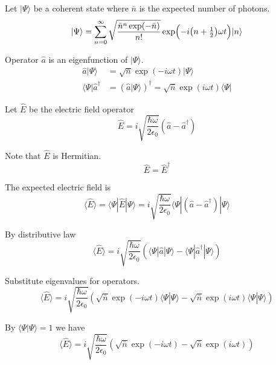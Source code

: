 \documentclass[12pt]{article}
\begin{document}
Let $|\Psi\rangle$ be a coherent state where $\bar n$ is the expected number of photons.
\begin{equation*}
|\Psi\rangle=\sum_{n=0}^\infty
\sqrt{\frac{\bar n^n\exp(-\bar n)}{n!}}
\exp\Bigl(-i\bigl(n+\tfrac{1}{2}\bigr)\omega t\Bigr)
|n\rangle
\end{equation*}

Operator $\hat a$ is an eigenfunction of $|\Psi\rangle$.
\begin{align*}
\hat a|\Psi\rangle&=\sqrt{\bar n}\exp(-i\omega t)|\Psi\rangle
\\
\langle\Psi|\hat a^\dag&=\left(\hat a|\Psi\rangle\right)^\dag=\sqrt{\bar n}\exp(i\omega t)\langle\Psi|
\end{align*}

Let $\hat E$ be the electric field operator
\begin{equation*}
\hat E=i\sqrt{\frac{\hbar\omega}{2\epsilon_0}}
(\hat a-\hat a^\dag)
\end{equation*}

Note that $\hat E$ is Hermitian.
\begin{equation*}
\hat E=\hat E^\dag
\end{equation*}

The expected electric field is
\begin{equation*}
\langle\hat E\rangle
=\langle\Psi|\hat E|\Psi\rangle
=i\sqrt{\frac{\hbar\omega}{2\epsilon_0}}
\langle\Psi|(\hat a-\hat a^\dag)|\Psi\rangle
\end{equation*}

By distributive law
\begin{equation*}
\langle\hat E\rangle
=i\sqrt{\frac{\hbar\omega}{2\epsilon_0}}
\left(\langle\Psi|\hat a|\Psi\rangle-\langle\Psi|\hat a^\dag|\Psi\rangle\right)
\end{equation*}

Substitute eigenvalues for operators.
\begin{equation*}
\langle\hat E\rangle
=i\sqrt{\frac{\hbar\omega}{2\epsilon_0}}
\left(\sqrt{\bar n}\exp(-i\omega t)\langle\Psi|\Psi\rangle-\sqrt{\bar n}\exp(i\omega t)\langle\Psi|\Psi\rangle\right)
\end{equation*}

By $\langle\Psi|\Psi\rangle=1$ we have
\begin{equation*}
\langle\hat E\rangle
=i\sqrt{\frac{\hbar\omega}{2\epsilon_0}}
\left(\sqrt{\bar n}\exp(-i\omega t)-\sqrt{\bar n}\exp(i\omega t)\right)
\end{equation*}
\end{document}
